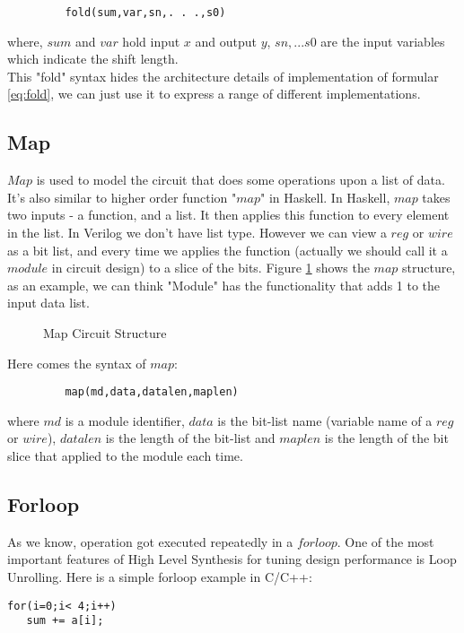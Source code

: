 \begin{verbatim}
         fold(sum,var,sn,. . .,s0)
\end{verbatim}
where, $sum$ and  $var$ hold input $x$ and output $y$, $sn,...s0$ are the input variables which indicate the shift length.
\\
This "fold" syntax hides the architecture details of implementation of formular \eqref{eq:fold}, we can just use it to express a range of different implementations.
\subsection{Map}
$Map$ is used to model the circuit that does some operations upon a list of data. It's also similar to higher order function "$map$" in Haskell. In Haskell, $map$ takes two inputs - a function, and a list. It then applies this function to every element in the list. In Verilog we don't have list type. However we can view a $reg$ or $wire$ as a bit list, and every time we applies the function (actually we should call it a $module$ in circuit design) to a slice of the bits. Figure \ref{fig-map} shows the $map$ structure, as an example, we can think  "Module" has the functionality that adds 1 to the input data list.
\begin{figure}[h]
\centering
{}
\caption{Map Circuit Structure}
\label{fig-map}
\end{figure}

Here comes the syntax of $map$:
\begin{verbatim}
         map(md,data,datalen,maplen)
\end{verbatim}
where $md$ is a module identifier, $data$ is the bit-list name (variable name of a $reg$ or $wire$), $datalen$ is the length of the bit-list and $maplen$ is the length of the bit slice that applied to the module each time.


\subsection{Forloop}
As we know, operation got executed repeatedly in a $forloop$.
One of the most important features of High Level Synthesis\cite{Tutorial:HLS} for tuning design performance is Loop Unrolling\cite{Verilog:Loop}. Here is a simple forloop example in C/C++:
\begin{verbatim}
for(i=0;i< 4;i++)
   sum += a[i];
\end{verbatim}

